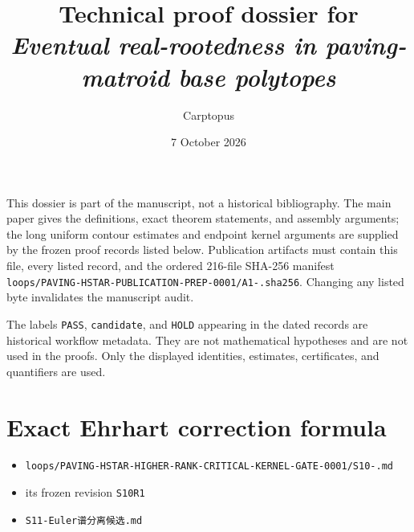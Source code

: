 \documentclass[10pt]{article}
\title{Technical proof dossier for\\
\emph{Eventual real-rootedness in paving-matroid base polytopes}}
\author{Carptopus}
\date{7 October 2026}
\begin{document}
\maketitle
\begin{center}
\end{center}


This dossier is part of the manuscript, not a historical bibliography.  The main
paper gives the definitions, exact theorem statements, and assembly arguments;
the long uniform contour estimates and endpoint kernel arguments are supplied by
the frozen proof records listed below.  Publication artifacts must contain this
file, every listed record, and the ordered 216-file SHA-256 manifest
\texttt{loops/\allowbreak{}PAVING-\allowbreak{}HSTAR-\allowbreak{}PUBLICATION-\allowbreak{}PREP-\allowbreak{}0001/\allowbreak{}A1-.\allowbreak{}sha256}.
Changing any listed byte invalidates the manuscript audit.

The labels \texttt{PASS}, \texttt{candidate}, and \texttt{HOLD} appearing in the dated records are
historical workflow metadata.  They are not mathematical hypotheses and are not
used in the proofs.  Only the displayed identities, estimates, certificates,
and quantifiers are used.

\section{Exact Ehrhart correction formula}


\begin{itemize}
\item \texttt{loops/\allowbreak{}PAVING-\allowbreak{}HSTAR-\allowbreak{}HIGHER-\allowbreak{}RANK-\allowbreak{}CRITICAL-\allowbreak{}KERNEL-\allowbreak{}GATE-\allowbreak{}0001/\allowbreak{}S10-.\allowbreak{}md}
\item its frozen revision \texttt{S10R1}
\item \texttt{S11-Euler{\cjkfont 谱\allowbreak{}分\allowbreak{}离\allowbreak{}候\allowbreak{}选}.\allowbreak{}md}
\end{itemize}
\end{document}
